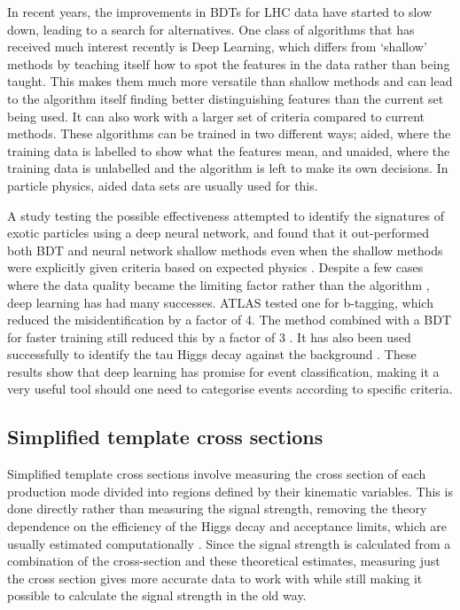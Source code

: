 \documentclass[12pt]{article}
\begin{document}
In recent years, the improvements in BDTs for LHC data have started to slow down, leading to a search for alternatives. One class of algorithms that has received much interest recently is Deep Learning, which differs from `shallow' methods by teaching itself how to spot the features in the data rather than being taught. This makes them much more versatile than shallow methods and can lead to the algorithm itself finding better distinguishing features than the current set being used. It can also work with a larger set of criteria compared to current methods. These algorithms can be trained in two different ways; aided, where the training data is labelled to show what the features mean, and unaided, where the training data is unlabelled and the algorithm is left to make its own decisions. In particle physics, aided data sets are usually used for this. 

A study testing the possible effectiveness attempted to identify the signatures of exotic particles using a deep neural network, and found that it out-performed both BDT and neural network shallow methods even when the shallow methods were explicitly given criteria based on expected physics \cite{ml9}. Despite a few cases where the data quality became the limiting factor rather than the algorithm \cite{ml3}, deep learning has had many successes. ATLAS tested one for b-tagging, which reduced the misidentification by a factor of 4. The method combined with a BDT for faster training still reduced this by a factor of 3 \cite{ml10}. It has also been used successfully to identify the tau Higgs decay against the background \cite{ml11}. These results show that deep learning has promise for event classification, making it a very useful tool should one need to categorise events according to specific criteria. 


\subsection*{Simplified template cross sections}
Simplified template cross sections involve measuring the cross section of each production mode divided into regions defined by their kinematic variables. This is done directly rather than measuring the signal strength, removing the theory dependence on the efficiency of the Higgs decay and acceptance limits, which are usually estimated computationally \cite{stxs2}. Since the signal strength is calculated from a combination of the cross-section and these theoretical estimates, measuring just the cross section gives more accurate data to work with while still making it possible to calculate the signal strength in the old way.
\end{document}
